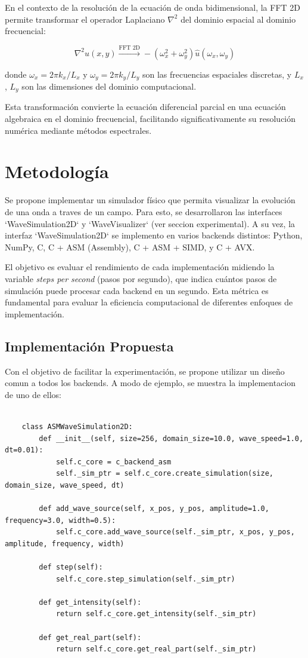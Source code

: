 \documentclass[a4paper]{article}
\begin{document}
En el contexto de la resolución de la ecuación de onda bidimensional, la FFT 2D permite transformar el operador Laplaciano $\nabla^2$
del dominio espacial al dominio frecuencial:

\begin{equation}
    \nabla^2 u(x,y) \xrightarrow{\text{FFT 2D}} -(\omega_x^2 + \omega_y^2) \hat{u}(\omega_x, \omega_y)
\end{equation}

donde $\omega_x = 2\pi k_x/L_x$ y $\omega_y = 2\pi k_y/L_y$ son las frecuencias espaciales discretas, y $L_x$, $L_y$ son las
dimensiones del dominio computacional.

Esta transformación convierte la ecuación diferencial parcial en una ecuación algebraica en el dominio frecuencial, facilitando
significativamente su resolución numérica mediante métodos espectrales.

\section{Metodología}
Se propone implementar un simulador físico que permita visualizar la evolución de una onda a traves de un campo. Para esto, se desarrollaron
las interfaces `WaveSimulation2D` y `WaveVisualizer` (ver seccion experimental). A su vez, la interfaz `WaveSimulation2D` se implemento en varios
backends distintos: Python, NumPy, C, C + ASM (Assembly), C + ASM + SIMD, y C + AVX.

El objetivo es evaluar el rendimiento de cada implementación midiendo la variable \textit{steps per second} (pasos por segundo), que
indica cuántos pasos de simulación puede procesar cada backend en un segundo. Esta métrica es fundamental para evaluar la eficiencia
computacional de diferentes enfoques de implementación.

\subsection{Implementación Propuesta}
Con el objetivo de facilitar la experimentación, se propone utilizar un diseño comun a todos los backends. A modo de ejemplo, se muestra
la implementacion de uno de ellos:

\begin{verbatim}
    
    class ASMWaveSimulation2D:
        def __init__(self, size=256, domain_size=10.0, wave_speed=1.0, dt=0.01):
            self.c_core = c_backend_asm
            self._sim_ptr = self.c_core.create_simulation(size, domain_size, wave_speed, dt)
        
        def add_wave_source(self, x_pos, y_pos, amplitude=1.0, frequency=3.0, width=0.5):
            self.c_core.add_wave_source(self._sim_ptr, x_pos, y_pos, amplitude, frequency, width)
        
        def step(self):
            self.c_core.step_simulation(self._sim_ptr)
        
        def get_intensity(self):
            return self.c_core.get_intensity(self._sim_ptr)
        
        def get_real_part(self):
            return self.c_core.get_real_part(self._sim_ptr)
\end{verbatim}
\end{document}

